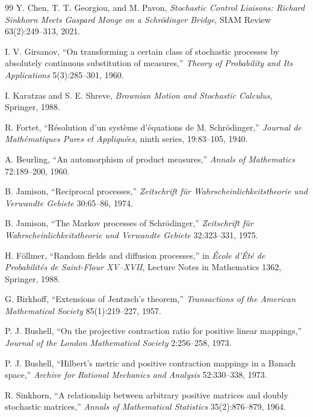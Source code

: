 \begin{thebibliography}{99}
Y. Chen, T. T. Georgiou, and M. Pavon,
\emph{Stochastic Control Liaisons: Richard Sinkhorn Meets Gaspard Monge on a Schr\"odinger Bridge},
SIAM Review 63(2):249--313, 2021.

I. V. Girsanov,
``On transforming a certain class of stochastic processes by absolutely continuous substitution of measures,''
\emph{Theory of Probability and Its Applications} 5(3):285--301, 1960.

I. Karatzas and S. E. Shreve,
\emph{Brownian Motion and Stochastic Calculus},
Springer, 1988.

R. Fortet,
``R\'esolution d'un syst\`eme d'\'equations de M. Schr\"odinger,''
\emph{Journal de Math\'ematiques Pures et Appliqu\'ees}, ninth series, 19:83--105, 1940.

A. Beurling,
``An automorphism of product measures,''
\emph{Annals of Mathematics} 72:189--200, 1960.

B. Jamison,
``Reciprocal processes,''
\emph{Zeitschrift f\"ur Wahrscheinlichkeitstheorie und Verwandte Gebiete} 30:65--86, 1974.

B. Jamison,
``The Markov processes of Schr\"odinger,''
\emph{Zeitschrift f\"ur Wahrscheinlichkeitstheorie und Verwandte Gebiete} 32:323--331, 1975.

H. F\"ollmer,
``Random fields and diffusion processes,''
in \emph{\'Ecole d'\'Et\'e de Probabilit\'es de Saint-Flour XV--XVII},
Lecture Notes in Mathematics 1362, Springer, 1988.

G. Birkhoff,
``Extensions of Jentzsch's theorem,''
\emph{Transactions of the American Mathematical Society} 85(1):219--227, 1957.

P. J. Bushell,
``On the projective contraction ratio for positive linear mappings,''
\emph{Journal of the London Mathematical Society} 2:256--258, 1973.

P. J. Bushell,
``Hilbert's metric and positive contraction mappings in a Banach space,''
\emph{Archive for Rational Mechanics and Analysis} 52:330--338, 1973.

R. Sinkhorn,
``A relationship between arbitrary positive matrices and doubly stochastic matrices,''
\emph{Annals of Mathematical Statistics} 35(2):876--879, 1964.


\end{thebibliography}
